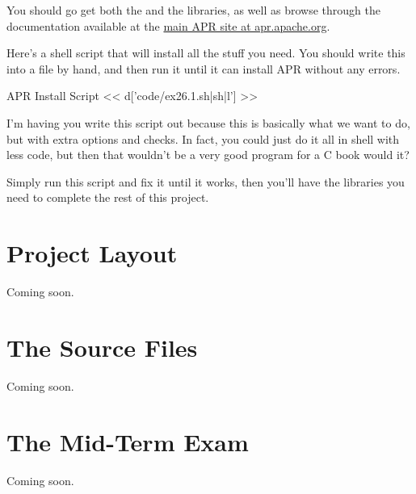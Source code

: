 You should go get both the  and the 
libraries, as well as browse through the documentation available at the 
\href{http://apr.apache.org/}{main APR site at apr.apache.org}.

Here's a shell script that will install all the stuff you need.  You
should write this into a file by hand, and then run it until it can
install APR without any errors.

\begin{code}{APR Install Script}
<< d['code/ex26.1.sh|sh|l'] >>
\end{code}

I'm having you write this script out because this is basically what
we want  to do, but with extra options and checks.
In fact, you could just do it all in shell with less code, but then
that wouldn't be a very good program for a C book would it?

Simply run this script and fix it until it works, then you'll have the
libraries you need to complete the rest of this project.


\section{Project Layout}

Coming soon.

\section{The Source Files}

Coming soon.


\section{The Mid-Term Exam}

Coming soon.

